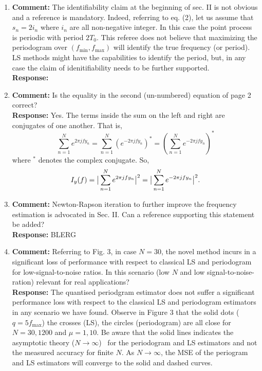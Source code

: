 \documentclass[a4paper,10pt]{article}
\begin{document}
\begin{enumerate}

\item\textbf{Comment:}
 The identifiability claim at the beginning of sec. II is not obvious and a reference is mandatory. Indeed, referring to eq. (2), let us assume that $s_n = 2 i_n$ where $i_n$ are all non-negative integer. In this case the point process is periodic with period $2 T_0$. This referee does not believe that maximizing the periodogram over $(f_{\text{min}},f_{\text{max}})$ will identify the true frequency (or period). LS methods might have the capabilities to identify the period, but, in any case the claim of idenitifiability needs to be further supported.
\\
\textbf{Response:}


\item\textbf{Comment:}
Is the equality in the second (un-numbered) equation of page 2 correct?
\\
\textbf{Response:}
Yes.  The terms inside the sum on the left and right are conjugates of one another.  That is,
\[
\sum_{n=1}^N e^{ 2\pi j f y_n} = \sum_{n=1}^N (e^{-2\pi j f y_n})^* = \left( \sum_{n=1}^N e^{ -2\pi j f y_n} \right)^*
\]
where $^*$ denotes the complex conjugate.  So,
\[
I_y(f) = \big\vert  \sum_{n=1}^N e^{ 2\pi j f y_n}  \big\vert^2 = \big\vert  \sum_{n=1}^N e^{ -2\pi j f y_n}  \big\vert^2.
\]

\item\textbf{Comment:}
Newton-Rapson iteration to further improve the frequency estimation is advocated in Sec. II. Can a reference supporting this statement be added?
\\
\textbf{Response:}
BLERG

\item\textbf{Comment:}
Referring to Fig. 3, in case $N=30$, the novel method incurs in a significant loss of performance with respect to classical LS and periodogram for low-signal-to-noise ratios. In this scenario (low $N$ and low signal-to-noise-ration) relevant for real applications?
\\
\textbf{Response:}
The quantised periodgram estimator does not suffer a significant performance loss with respect to the classical LS and periodogram estimators in any scenario we have found.  Observe in Figure 3 that the solid dots ($q=5 f_{\text{max}}$) the crosses (LS), the circles (periodogram) are all close for $N=30,1200$ and $\mu=1,10$.  Be aware that the solid lines indicates the asymptotic theory ($N\to\infty$)~\cite{Quinn_sparse_noisy_SSP_2012,Quinn20013asilomar_period_est} for the periodogram and LS estimators and not the measured accuracy for finite $N$.  As $N\to\infty$, the MSE of the periogram and LS estimators will converge to the solid and dashed curves.

\end{enumerate}



{\small

}
\end{document}
